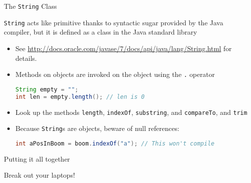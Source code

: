 \documentclass{beamer}
\begin{document}
\begin{frame}[fragile]{The {\tt String} Class}

{\tt String} acts like primitive thanks to syntactic sugar provided by the Java compiler, but it is defined as a class in the Java standard library

\begin{itemize}

\item See \url{http://docs.oracle.com/javase/7/docs/api/java/lang/String.html} for details.

\item Methods on objects are invoked on the object using the {\tt .} operator
\begin{lstlisting}[language=Java]
String empty = "";
int len = empty.length(); // len is 0
\end{lstlisting}

\item Look up the methods {\tt length}, {\tt indexOf}, {\tt substring}, and {\tt compareTo}, and {\tt trim}

\item Because {\tt String}s are objects, beware of null references:
\begin{lstlisting}[language=Java]
int aPosInBoom = boom.indexOf("a"); // This won't compile
\end{lstlisting}

\end{itemize}

\end{frame}

\begin{frame}[fragile]{Putting it all together}

Break out your laptops!

\end{frame}
\end{document}
